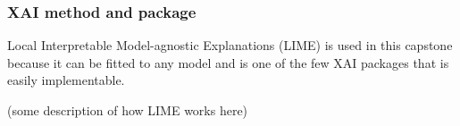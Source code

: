 \subsubsection{XAI method and package}

Local Interpretable Model-agnostic Explanations (LIME) is used in this capstone because it can be fitted to any model and is one of the few XAI packages that is easily implementable. 

(some description of how LIME works here)